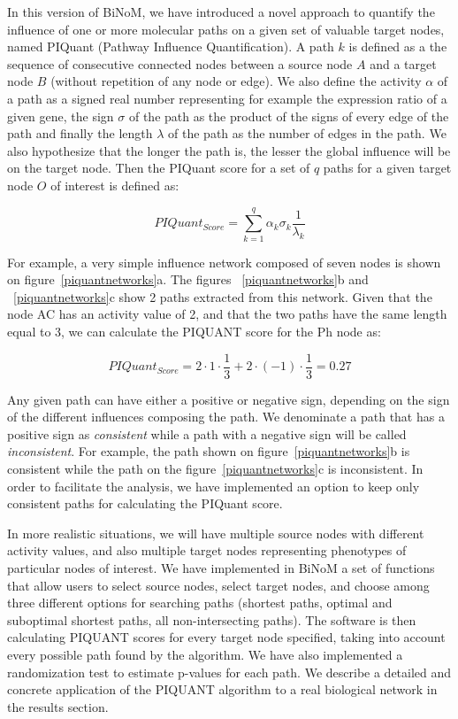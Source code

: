 \documentclass[10pt]{bmc_article}
\newenvironment{bmcformat}{\baselineskip20pt\sloppy\setboolean{publ}{false}}{\baselineskip20pt\sloppy}
\begin{document}
\begin{bmcformat}
%
%

In this version of BiNoM, we have introduced a novel approach to quantify the
influence of one or more molecular paths on a given set of valuable target
nodes, named PIQuant (Pathway Influence Quantification). A path $k$ is defined
as a the sequence of consecutive connected nodes
between a source node $A$ and a target node $B$ (without repetition of any node
or edge). We also define the activity $\alpha$ of a path as a signed real number
representing for example the expression ratio of a given gene, the sign $\sigma$
of the path as the product of the signs of every edge of the path and finally
the length $\lambda$ of the path as the number of edges in the path. We also
hypothesize that the longer the path is, the lesser the global influence will be
on the target node. Then the PIQuant score for a set of $q$ paths for a given
target node $O$ of interest is defined as:

$$
 PIQuant_{Score} = \sum_{k=1}^{q} \alpha_{k} \sigma_{k} \frac{1}{\lambda_{k}}
$$

For example, a very simple influence network composed of seven nodes is shown on
figure~\ref{piquantnetworks}a. The figures ~\ref{piquantnetworks}b and
~\ref{piquantnetworks}c show 2 paths extracted from this network. Given that the
node AC has an activity value of 2, and that the two paths have the same length
equal to 3, we can calculate the PIQUANT score for the Ph node as:

$$
 PIQuant_{Score} = 2 \cdot 1 \cdot \frac{1}{3} + 2 \cdot (-1) \cdot \frac{1}{3}
= 0.27
$$


Any given path can have either a positive or negative
sign, depending on the sign of the different influences composing the path. We
denominate a path that has a positive sign as \textit{consistent} while a path
with a negative sign will be called \textit{inconsistent}. 
For example, the path shown on figure~\ref{piquantnetworks}b is consistent while
the path on the figure~\ref{piquantnetworks}c is inconsistent. In order to
facilitate the analysis, we have implemented an option to keep only consistent
paths for calculating the PIQuant score.


In more realistic situations, we will have multiple source nodes with different
activity values, and also multiple target nodes representing phenotypes of
particular nodes of interest. We have implemented in BiNoM a set of functions
that allow users to select source nodes, select target nodes, and choose among
three different options for searching paths (shortest paths, optimal and
suboptimal shortest paths, all non-intersecting paths). The software is then
calculating PIQUANT scores for every target node specified, taking into account
every possible path found by the algorithm. We have also implemented a
randomization test to estimate p-values for each path. We describe a detailed
and concrete application of the PIQUANT algorithm to a real biological network
in the results section.


\end{bmcformat}
\end{document}
